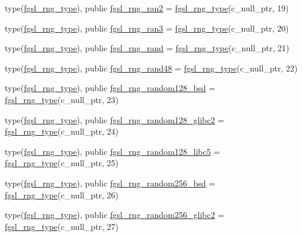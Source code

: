 \begin{DoxyCompactItemize}
\item 
type(\hyperlink{structfgsl_1_1fgsl__rng__type}{fgsl\+\_\+rng\+\_\+type}), public \hyperlink{namespacefgsl_a82dd93da12a619eb5cbf8a4d32e44daa}{fgsl\+\_\+rng\+\_\+ran2} = \hyperlink{structfgsl_1_1fgsl__rng__type}{fgsl\+\_\+rng\+\_\+type}(c\+\_\+null\+\_\+ptr, 19)
\item 
type(\hyperlink{structfgsl_1_1fgsl__rng__type}{fgsl\+\_\+rng\+\_\+type}), public \hyperlink{namespacefgsl_a2bcafc9c66a493e0ad7ead60bf9d9a0e}{fgsl\+\_\+rng\+\_\+ran3} = \hyperlink{structfgsl_1_1fgsl__rng__type}{fgsl\+\_\+rng\+\_\+type}(c\+\_\+null\+\_\+ptr, 20)
\item 
type(\hyperlink{structfgsl_1_1fgsl__rng__type}{fgsl\+\_\+rng\+\_\+type}), public \hyperlink{namespacefgsl_afbedce588830713e9a4f2dfdebe1a262}{fgsl\+\_\+rng\+\_\+rand} = \hyperlink{structfgsl_1_1fgsl__rng__type}{fgsl\+\_\+rng\+\_\+type}(c\+\_\+null\+\_\+ptr, 21)
\item 
type(\hyperlink{structfgsl_1_1fgsl__rng__type}{fgsl\+\_\+rng\+\_\+type}), public \hyperlink{namespacefgsl_ae82ea40ab1281a4f6390dc0fd2ba998b}{fgsl\+\_\+rng\+\_\+rand48} = \hyperlink{structfgsl_1_1fgsl__rng__type}{fgsl\+\_\+rng\+\_\+type}(c\+\_\+null\+\_\+ptr, 22)
\item 
type(\hyperlink{structfgsl_1_1fgsl__rng__type}{fgsl\+\_\+rng\+\_\+type}), public \hyperlink{namespacefgsl_a398996158c507375c9f2d554deb5d27b}{fgsl\+\_\+rng\+\_\+random128\+\_\+bsd} = \hyperlink{structfgsl_1_1fgsl__rng__type}{fgsl\+\_\+rng\+\_\+type}(c\+\_\+null\+\_\+ptr, 23)
\item 
type(\hyperlink{structfgsl_1_1fgsl__rng__type}{fgsl\+\_\+rng\+\_\+type}), public \hyperlink{namespacefgsl_aa3d875270ff8191378a356c1b7aadc43}{fgsl\+\_\+rng\+\_\+random128\+\_\+glibc2} = \hyperlink{structfgsl_1_1fgsl__rng__type}{fgsl\+\_\+rng\+\_\+type}(c\+\_\+null\+\_\+ptr, 24)
\item 
type(\hyperlink{structfgsl_1_1fgsl__rng__type}{fgsl\+\_\+rng\+\_\+type}), public \hyperlink{namespacefgsl_a49f71c990dc8dddacbdcdc1a012c4654}{fgsl\+\_\+rng\+\_\+random128\+\_\+libc5} = \hyperlink{structfgsl_1_1fgsl__rng__type}{fgsl\+\_\+rng\+\_\+type}(c\+\_\+null\+\_\+ptr, 25)
\item 
type(\hyperlink{structfgsl_1_1fgsl__rng__type}{fgsl\+\_\+rng\+\_\+type}), public \hyperlink{namespacefgsl_aa0a98fef28a7dc6e538ab97f5f07fc22}{fgsl\+\_\+rng\+\_\+random256\+\_\+bsd} = \hyperlink{structfgsl_1_1fgsl__rng__type}{fgsl\+\_\+rng\+\_\+type}(c\+\_\+null\+\_\+ptr, 26)
\item 
type(\hyperlink{structfgsl_1_1fgsl__rng__type}{fgsl\+\_\+rng\+\_\+type}), public \hyperlink{namespacefgsl_aca7a71613cf5e355ebfe501bd30a0062}{fgsl\+\_\+rng\+\_\+random256\+\_\+glibc2} = \hyperlink{structfgsl_1_1fgsl__rng__type}{fgsl\+\_\+rng\+\_\+type}(c\+\_\+null\+\_\+ptr, 27)

\end{DoxyCompactItemize}
